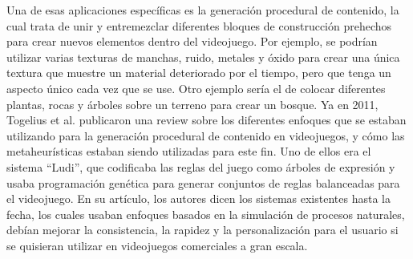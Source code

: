 





Una de esas aplicaciones específicas es la generación procedural de contenido, la cual trata de unir y entremezclar diferentes bloques de construcción prehechos para crear nuevos elementos dentro del videojuego. Por ejemplo, se podrían utilizar varias texturas de manchas, ruido, metales y óxido para crear una única textura que muestre un material deteriorado por el tiempo, pero que tenga un aspecto único cada vez que se use. Otro ejemplo sería el de colocar diferentes plantas, rocas y árboles sobre un terreno para crear un bosque. Ya en 2011, Togelius et al. \cite{togelius_search-based_2011} publicaron una review sobre los diferentes enfoques que se estaban utilizando para la generación procedural de contenido en videojuegos, y cómo las metaheurísticas estaban siendo utilizadas para este fin. Uno de ellos era el sistema ``Ludi'', que codificaba las reglas del juego como árboles de expresión y usaba programación genética para generar conjuntos de reglas balanceadas para el videojuego. En su artículo, los autores dicen los sistemas existentes hasta la fecha, los cuales usaban enfoques basados en la simulación de procesos naturales, debían mejorar la consistencia, la rapidez y la personalización para el usuario si se quisieran utilizar en videojuegos comerciales a gran escala. 

